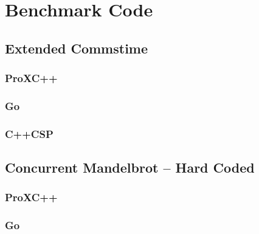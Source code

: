 

\chapter{Benchmark Code}
\label{ch:benchmark_code}

\section*{Extended Commstime}

\subsection*{ProXC++}


\subsection*{Go}


\subsection*{C++CSP}


\section*{Concurrent Mandelbrot -- Hard Coded}

\subsection*{ProXC++}


\subsection*{Go}


